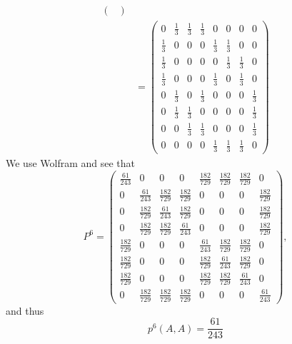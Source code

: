 \documentclass[11pt]{article}
\begin{document}
\begin{problem}
\begin{enumerate}
\begin{solution}
\begin{align*}
\begin{pmatrix}
\end{pmatrix}\\
&= \begin{pmatrix}
0 & \frac{1}{3} & \frac{1}{3} & \frac{1}{3} & 0 & 0 & 0 & 0 \\
\frac{1}{3} & 0 & 0 & 0 & \frac{1}{3} & \frac{1}{3} & 0 & 0 \\
\frac{1}{3} & 0 & 0 & 0 & 0 & \frac{1}{3} & \frac{1}{3} & 0 \\
\frac{1}{3} & 0 & 0 & 0 & \frac{1}{3} & 0 & \frac{1}{3} & 0 \\
0 & \frac{1}{3} & 0 & \frac{1}{3} & 0 & 0 & 0 & \frac{1}{3} \\
0 & \frac{1}{3} & \frac{1}{3} & 0 & 0 & 0 & 0 & \frac{1}{3} \\
0 & 0 & \frac{1}{3} & \frac{1}{3} & 0 & 0 & 0 & \frac{1}{3} \\
0 & 0 & 0 & 0 & \frac{1}{3} & \frac{1}{3} & \frac{1}{3} & 0
\end{pmatrix}
    \end{align*}
We use Wolfram and see that 
\[P^6 = \begin{pmatrix}
\frac{61}{243} & 0 & 0 & 0 & \frac{182}{729} & \frac{182}{729} & \frac{182}{729} & 0 \\
0 & \frac{61}{243} & \frac{182}{729} & \frac{182}{729} & 0 & 0 & 0 & \frac{182}{729} \\
0 & \frac{182}{729} & \frac{61}{243} & \frac{182}{729} & 0 & 0 & 0 & \frac{182}{729} \\
0 & \frac{182}{729} & \frac{182}{729} & \frac{61}{243} & 0 & 0 & 0 & \frac{182}{729} \\
\frac{182}{729} & 0 & 0 & 0 & \frac{61}{243} & \frac{182}{729} & \frac{182}{729} & 0 \\
\frac{182}{729} & 0 & 0 & 0 & \frac{182}{729} & \frac{61}{243} & \frac{182}{729} & 0 \\
\frac{182}{729} & 0 & 0 & 0 & \frac{182}{729} & \frac{182}{729} & \frac{61}{243} & 0 \\
0 & \frac{182}{729} & \frac{182}{729} & \frac{182}{729} & 0 & 0 & 0 & \frac{61}{243}
\end{pmatrix},\] and thus \[\boxed{p^6(A,A) = \frac{61}{243}}\]
\end{solution}
\end{enumerate}
\end{problem}
\newpage
\end{document}
